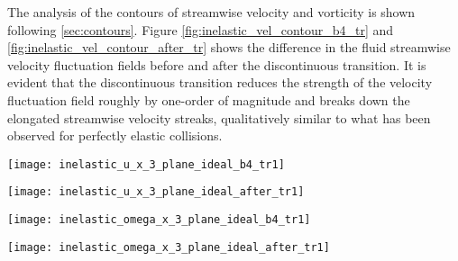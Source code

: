 \documentclass[aip,graphicx]{revtex4-1}
\begin{document}
The analysis of the contours of streamwise velocity and vorticity is shown following \ref{sec:contours}.
Figure \ref{fig:inelastic_vel_contour_b4_tr} and \ref{fig:inelastic_vel_contour_after_tr} shows the difference in the fluid streamwise velocity fluctuation fields before and after the discontinuous transition. It is evident that the discontinuous transition reduces the strength of the velocity fluctuation field roughly by one-order of magnitude and breaks down the elongated streamwise velocity streaks, qualitatively similar to what has been observed for perfectly elastic collisions. 
\begin{figure*}[h!]
\centering
\texttt{[image: inelastic\_u\_x\_3\_plane\_ideal\_b4\_tr1]}
	\caption{Contours of streamwise velocity fluctuations of fluid phase laden with particles of Volume Fraction $\phi_{cr}=8.3125X10^{-4}$ showed in three different planes as shown in the figures in presence of inelastic ($e=0.9$) inter-particle Collisions} 
	\label{fig:inelastic_vel_contour_b4_tr}
\end{figure*}
\begin{figure*}[!h]
\centering
\texttt{[image: inelastic\_u\_x\_3\_plane\_ideal\_after\_tr1]}
	\caption{Contours of streamwise velocity fluctuations of fluid phase laden with particles of Volume Fraction $\phi=8.75X10^{-4}$ showed in three different planes as shown in the figures in presence of inelastic ($e=0.9$) inter-particle collisions} 
	\label{fig:inelastic_vel_contour_after_tr}
\end{figure*}
\begin{figure*}[!h]
\centering
\texttt{[image: inelastic\_omega\_x\_3\_plane\_ideal\_b4\_tr1]}
	\caption{Contours of streamwise vorticity fluctuations of fluid phase laden with particles of Volume Fraction $\phi_{cr}=8.3125X10^{-4}$ showed in three different planes as shown in the figures in Presence of inelastic ($e=0.9$) inter-particle Collisions} 
	\label{fig:inelastic_vort_contour_b4_tr}
\end{figure*}
\begin{figure*}[!h]
\centering
\texttt{[image: inelastic\_omega\_x\_3\_plane\_ideal\_after\_tr1]}
	\caption{Contours of streamwise vorticity fluctuations of fluid phase laden with particles of volume fraction $\phi=8.75X10^{-4}$ showed in three different planes as shown in the figures in presence of inelastic ($e=0.9$) inter-particle collisions} 
	\label{fig:inelastic_vort_contour_aftr_tr}
\end{figure*}
\end{document}
